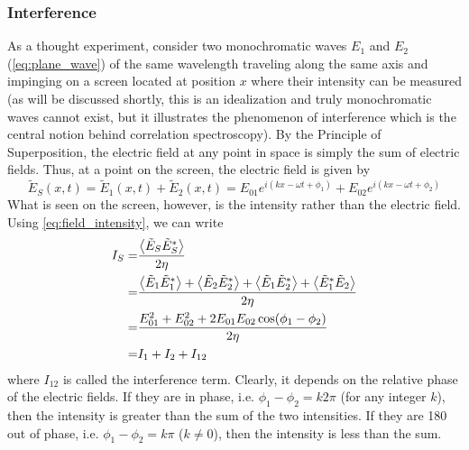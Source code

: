 \subsubsection{Interference}
As a thought experiment, consider two monochromatic waves $E_1$ and $E_2$ (\autoref{eq:plane_wave}) of the same wavelength traveling along the same axis and impinging on a screen located at position $x$ where their intensity can be measured (as will be discussed shortly, this is an idealization and truly monochromatic waves cannot exist, but it illustrates the phenomenon of interference which is the central notion behind correlation spectroscopy). By the Principle of Superposition, the electric field at any point in space is simply the sum of electric fields. Thus, at a point on the screen, the electric field is given by
\begin{equation} \label{eq:interference_field_sum}
\tilde{E}_S(x,t) = \tilde{E}_1(x,t)+\tilde{E}_2(x,t) = E_{01}e^{i(kx-\omega t+\phi_1)} + E_{02}e^{i(kx-\omega t+\phi_2)} 
\end{equation}
What is seen on the screen, however, is the intensity rather than the electric field. Using \autoref{eq:field_intensity}, we can write
\begin{align}
I_S  =& \frac{\expval{\tilde{E}_S\tilde{E}_S^*}}{2\eta} \\
     =& \frac{\expval{\tilde{E}_1\tilde{E}_1^*} 
         + \expval{\tilde{E}_2\tilde{E}_2^*} 
         + \expval{\tilde{E}_1\tilde{E}_2^*} 
         + \expval{\tilde{E}_1^*\tilde{E}_2}}{2\eta} \label{eq:interference} \\
     =& \frac{E_{01}^2 + E_{02}^2 + 2E_{01}E_{02}\cos(\phi_1-\phi_2)}{2\eta} \\
     =& I_1 + I_2 + I_{12}
\end{align}
where $I_{12}$ is called the interference term. Clearly, it depends on the relative phase of the electric fields. If they are in phase, i.e. $\phi_1-\phi_2=k2\pi$ (for any integer $k$), then the intensity is greater than the sum of the two intensities. If they are 180\textdegree{} out of phase, i.e. $\phi_1-\phi_2=k\pi$ ($k\neq 0$), then the intensity is less than the sum. 


